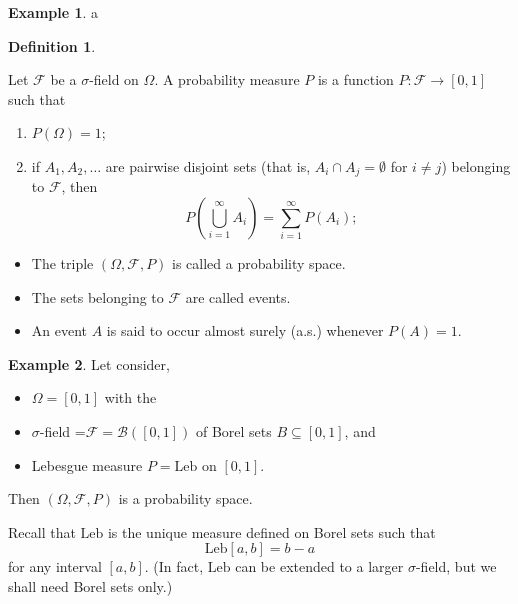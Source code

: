 \documentclass[
]{book}
\providecommand{\tightlist}{%
  \setlength{\itemsep}{0pt}\setlength{\parskip}{0pt}}
\theoremstyle{definition}
\newtheorem{definition}{Definition}[chapter]
\theoremstyle{definition}
\newtheorem{example}{Example}[chapter]
\theoremstyle{definition}
\theoremstyle{definition}
\theoremstyle{remark}
\begin{document}
\begin{example}
\protect\hypertarget{exm:unnamed-chunk-8}{}\label{exm:unnamed-chunk-8}a
\end{example}

\begin{definition}
\protect\hypertarget{def:unnamed-chunk-9}{}\label{def:unnamed-chunk-9}

Let \(\mathcal{F}\) be a \(\sigma\)-field on \(\Omega\). A probability measure \(P\) is a function
\(P : \mathcal{F} \to [0, 1]\)
such that

\begin{enumerate}
\def\labelenumi{\arabic{enumi}.}
\tightlist
\item
  \(P(\Omega) = 1\);
\item
  if \(A_1, A_2, \ldots\) are pairwise disjoint sets (that is, \(A_i \cap A_j = \emptyset\) for \(i \neq j\)) belonging to \(\mathcal{F}\), then
  \[
  P\left(\bigcup_{i=1}^{\infty} A_i\right) = \sum_{i=1}^{\infty} P(A_i);
  \]
\end{enumerate}

\begin{itemize}
\tightlist
\item
  The triple \((\Omega, \mathcal{F}, P)\) is called a probability space.
\item
  The sets belonging to \(\mathcal{F}\) are called events.
\item
  An event \(A\) is said to occur almost surely (a.s.) whenever \(P(A) = 1\).
\end{itemize}

\end{definition}

\begin{example}
\protect\hypertarget{exm:unnamed-chunk-10}{}\label{exm:unnamed-chunk-10}Let consider,

\begin{itemize}
\tightlist
\item
  \(\Omega=[0, 1]\) with the
\item
  \(\sigma\)-field =\(\mathcal{F} = \mathcal{B}([0, 1])\) of Borel sets \(B \subseteq [0, 1]\), and
\item
  Lebesgue measure \(P = \text{Leb}\) on \([0, 1]\).
\end{itemize}

Then \((\Omega, \mathcal{F}, P)\) is a probability space.

Recall that \(\text{Leb}\) is the unique measure defined on Borel sets such that
\[\text{Leb}[a, b] = b - a\]
for any interval \([a, b]\). (In fact, \(\text{Leb}\) can be extended to a larger \(\sigma\)-field, but we shall need Borel sets only.)
\end{example}
\end{document}
